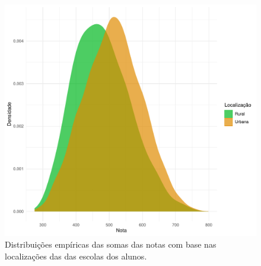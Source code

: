 \newpage
\begin{figure}[htb]
    \caption{Distribuições empíricas das somas das notas com base nas localizações das
    das escolas dos alunos.}
    \begin{center}
        \includegraphics[width=16cm]{img/loc_notas.pdf}
    \end{center}
\end{figure}



